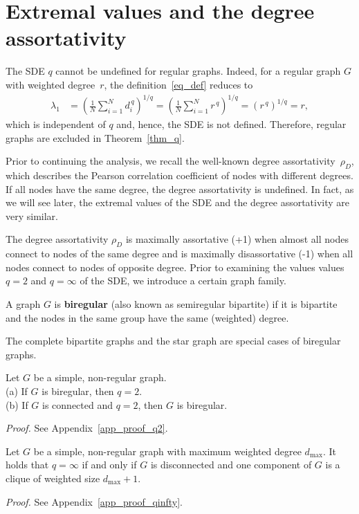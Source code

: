 \documentclass{comnet}%
\begin{document}
\section{Extremal values and the degree assortativity}\label{sec_extremal_values}
The SDE $q$ cannot be undefined for regular graphs. Indeed, for a regular graph $G$ with weighted degree~$r$, the definition~\eqref{eq_def} reduces to
\begin{align*}
	\lambda_1 &= \left( \frac{1}{N} \sum_{i=1}^N d_i^{\, q} \right)^{1/q} = \left( \frac{1}{N} \sum_{i=1}^N r^{\, q} \right)^{1/q} = \left( r^{\, q} \right)^{1/q} = r,
\end{align*}
which is independent of $q$ and, hence, the SDE is not defined. Therefore, regular graphs are excluded in Theorem~\ref{thm_q}.

Prior to continuing the analysis, we recall the well-known degree assortativity~$\rho_D$, which describes the Pearson correlation coefficient of nodes with different degrees. If all nodes have the same degree, the degree assortativity is undefined. In fact, as we will see later, the extremal values of the SDE and the degree assortativity are very similar.

The degree assortativity $\rho_D$ is maximally assortative (+1) when almost all nodes connect to nodes of the same degree and is maximally disassortative (-1) when all nodes connect to nodes of opposite degree. Prior to examining the values values $q=2$ and $q=\infty$ of the SDE, we introduce a certain graph family.

\begin{definition}
	A graph $G$ is \textbf{biregular} (also known as semiregular bipartite) if it is bipartite and the nodes in the same group have the same (weighted) degree.
\end{definition}
The complete bipartite graphs and the star graph are special cases of biregular graphs.

\begin{theorem} Let $G$ be a simple, non-regular graph. \\
	\phantom{a}\qquad (a) If $G$ is biregular, then $q=2$. \\
	\phantom{a}\qquad (b) If $G$ is connected and $q=2$, then $G$ is biregular.
	\label{thm_q=2}
\end{theorem}
\textit{Proof.} See Appendix~\ref{app_proof_q2}.


\begin{theorem}
	Let $G$ be a simple, non-regular graph with maximum weighted degree $d_{\max}$. It holds that $q=\infty$ if and only if $G$ is disconnected and one component of $G$ is a clique of weighted size $d_{\max}+1$.
	\label{thm_q=infty}
\end{theorem}
\textit{Proof.} See Appendix~\ref{app_proof_qinfty}.
\end{document}
